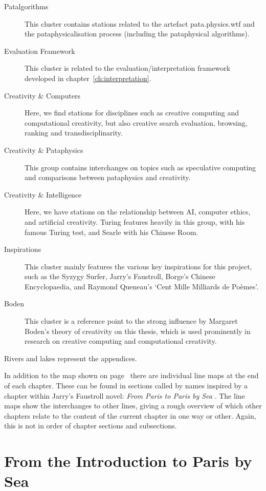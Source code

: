 \begin{description}
  \item [Patalgorithms] This cluster contains stations related to the artefact pata.physics.wtf and the pataphysicalisation process (including the pataphysical algorithms).
  \item [Evaluation Framework] This cluster is related to the evaluation/interpretation framework developed in chapter~\ref{ch:interpretation}.
  \item [Creativity \& Computers] Here, we find stations for disciplines such as creative computing and computational creativity, but also creative search evaluation, browsing, ranking and transdisciplinarity. 
  \item [Creativity \& Pataphysics] This group contains interchanges on topics such as speculative computing and comparisons between pataphysics and creativity.
  \item [Creativity \& Intelligence] Here, we have stations on the relationship between \acs{AI}, computer ethics, and artificial creativity. Turing features heavily in this group, with his famous Turing test, and Searle with his Chinese Room.
  \item [Inspirations] This cluster mainly features the various key inspirations for this project, such as the Syzygy Surfer, Jarry's Faustroll, Borge's Chinese Encyclopaedia, and Raymond Queneau's `Cent Mille Milliards de Poèmes'.
  \item [Boden] This cluster is a reference point to the strong influence by Margaret Boden's theory of creativity on this thesis, which is used prominently in research on creative computing and computational creativity.
\end{description}

Rivers and lakes represent the appendices. 

\spirals

In addition to the map shown on page~\pageref{map} there are individual line maps at the end of each chapter. These can be found in sections called by names inspired by a chapter within Jarry's Faustroll novel: \textit{From Paris to Paris by Sea} \autocite*{Jarry1996}. The line maps show the interchanges to other lines, giving a rough overview of which other chapters relate to the content of the current chapter in one way or other. Again, this is not in order of chapter sections and subsections.


\section{From the Introduction to Paris by Sea}

